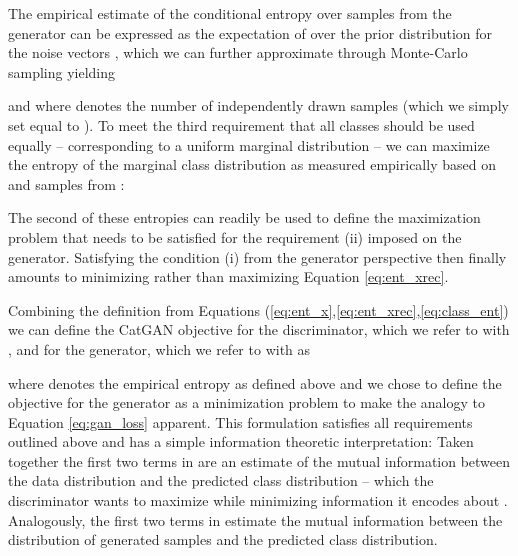 \documentclass{article} \usepackage{iclr2016_conference,times}
\begin{document}
The empirical estimate of the conditional entropy over samples from
the generator can be expressed as the expectation of  over the prior distribution  for the noise
vectors , which we can further approximate through Monte-Carlo
sampling yielding

and where  denotes the number of independently drawn samples (which
we simply set equal to ).
To meet the third requirement that all classes should be used equally --
corresponding to a uniform marginal distribution -- we can
maximize the entropy of the marginal class distribution as measured
empirically based on  and samples from :

The second of these entropies can readily be used to define the
maximization problem that needs to be satisfied for the requirement (ii)
imposed on the generator. Satisfying the condition (i) from
the generator perspective then finally amounts to minimizing rather
than maximizing Equation \eqref{eq:ent_xrec}.

Combining the definition from Equations
(\ref{eq:ent_x},\ref{eq:ent_xrec},\ref{eq:class_ent}) we can
define the CatGAN objective for the discriminator, which we refer to
with , and for the generator, which we refer to with
 as

where  denotes the empirical entropy as defined above and we chose
to define the objective for the generator  as a
minimization problem to make the analogy to Equation
\eqref{eq:gan_loss} apparent. This formulation satisfies all
requirements outlined above and has a simple information theoretic
interpretation: Taken together the first two terms in
 are an estimate of the mutual information between
the data distribution and the predicted class distribution -- which
the discriminator wants to maximize while minimizing information it
encodes about . Analogously, the first two terms in
 estimate the mutual information between the
distribution of generated samples and the predicted class
distribution.
\end{document}
